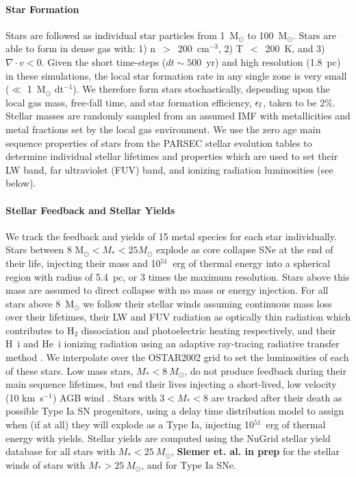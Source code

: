 \documentclass[twocolumn]{aastex61}
\begin{document}
\paragraph{Star Formation} Stars are followed as individual star particles from 1~M$_{\odot}$ to 100~M$_{\odot}$. Stars are able to form in dense gas with: 1) n~$>$~200~cm$^{-3}$, 2) T~$<$~200~K, and 3) $\nabla \cdot v < 0$. Given the short time-steps ($dt \sim 500$~yr) and high resolution (1.8~pc) in these simulations, the local star formation rate in any single zone is very small ($\ll$ 1~M$_{\odot}$ dt$^{-1}$). We therefore form stars stochastically, depending upon the local gas mass, free-fall time, and star formation efficiency, $\epsilon_{\rm f}$, taken to be 2\%. Stellar masses are randomly sampled from an assumed \cite{Salpeter1955} IMF with metallicities and metal fractions set by the local gas environment. We use the zero age main sequence properties of stars from the \textsc{PARSEC} stellar evolution tables \citep{Bressan2012,Tang2014} to determine individual stellar lifetimes and properties which are used to set their LW band, far ultraviolet (FUV) band, and ionizing radiation luminosities (see below).

\paragraph{Stellar Feedback and Stellar Yields} We track the feedback and yields of 15 metal species for each star individually. Stars between 8 M$_{\odot} < M_{*} < 25 M_{\odot}$ explode as core collapse SNe at the end of their life, injecting their mass and 10$^{51}$~erg of thermal energy into a spherical region with radius of 5.4~pc, or 3 times the maximum resolution. Stars above this mass are assumed to direct collapse with no mass or energy injection. For all stars above 8~M$_{\odot}$ we follow their stellar winds assuming continuous mass loss over their lifetimes, their LW and FUV radiation as optically thin radiation which contributes to H$_2$ dissociation and photoelectric heating respectively, and their H~{\sc i} and He~{\sc i} ionizing radiation using an adaptive ray-tracing radiative transfer method \citep{WiseAbel2011}. We interpolate over the OSTAR2002 \citep{Lanz2003} grid to set the luminosities of each of these stars. Low mass stars, $M_{*} < 8~M_{\odot}$, do not produce feedback during their main sequence lifetimes, but end their lives injecting a short-lived, low velocity (10 km~s$^{-1}$) AGB wind \citep{Goldman2017}. Stars with $3 < M_{*} < 8$ are tracked after their death as possible Type Ia SN progenitors, using a delay time distribution model to assign when (if at all) they will explode as a Type Ia, injecting 10$^{51}$~erg of thermal energy with yields. Stellar yields are computed using the NuGrid stellar yield database \citep{Ritter2017} for all stars with $M_{*} < 25~M_{\odot}$, \textbf{Slemer et. al. in prep} for the stellar winds of stars with $M_{*} > 25~M_{\odot}$, and \cite{Thielemann1986} for Type Ia SNe.
\end{document}
